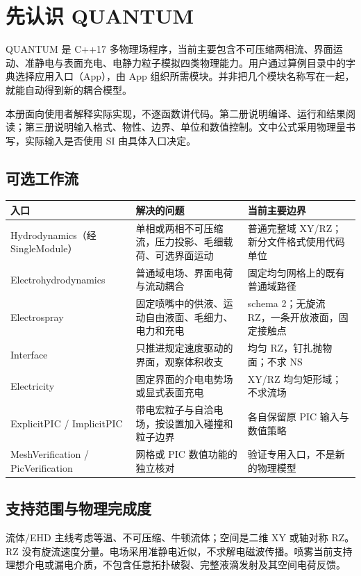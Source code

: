 \documentclass[a4paper,11pt]{article}
\begin{document}

\section{先认识 QUANTUM}
QUANTUM 是 C++17 多物理场程序，当前主要包含不可压缩两相流、界面运动、准静电与表面充电、电静力粒子模拟四类物理能力。用户通过算例目录中的字典选择应用入口（App），由 App 组织所需模块。并非把几个模块名称写在一起，就能自动得到新的耦合模型。

本册面向使用者解释实际实现，不逐函数讲代码。第二册说明编译、运行和结果阅读；第三册说明输入格式、物性、边界、单位和数值控制。文中公式采用物理量书写，实际输入是否使用 SI 由具体入口决定。

\subsection{可选工作流}
\begin{longtable}{L{.24\linewidth}L{.34\linewidth}L{.34\linewidth}}
\toprule 入口 & 解决的问题 & 当前主要边界 \\\midrule\endhead
Hydrodynamics（经 SingleModule） & 单相或两相不可压缩流，压力投影、毛细载荷、可选界面运动 & 普通完整域 XY/RZ；新分文件格式使用代码单位 \\
Electrohydrodynamics & 普通域电场、界面电荷与流动耦合 & 固定均匀网格上的既有普通域路径 \\
Electrospray & 固定喷嘴中的供液、运动自由液面、毛细力、电力和充电 & schema 2；无旋流 RZ，一条开放液面，固定接触点 \\
Interface & 只推进规定速度驱动的界面，观察体积收支 & 均匀 RZ，钉扎抛物面；不求 NS \\
Electricity & 固定界面的介电电势场或显式表面充电 & XY/RZ 均匀矩形域；不求流场 \\
ExplicitPIC / ImplicitPIC & 带电宏粒子与自洽电场，按设置加入碰撞和粒子边界 & 各自保留原 PIC 输入与数值策略 \\
MeshVerification / PicVerification & 网格或 PIC 数值功能的独立核对 & 验证专用入口，不是新的物理模型 \\
\bottomrule
\end{longtable}

\subsection{支持范围与物理完成度}
流体/EHD 主线考虑等温、不可压缩、牛顿流体；空间是二维 XY 或轴对称 RZ。RZ 没有旋流速度分量。电场采用准静电近似，不求解电磁波传播。喷雾当前支持理想介电或漏电介质，不包含任意拓扑破裂、完整液滴发射及其空间电荷反馈。
\end{document}

